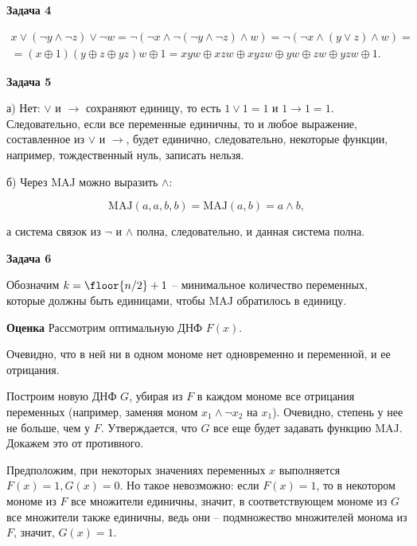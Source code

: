 	\begin{center}
    \textbf{Задача 4}
\end{center}
		\begin{multline*}
			x \lor (\neg y \land \neg z) \lor \neg w = \neg (\neg x \land \neg (\neg y \land \neg z) \land w) = \neg (\neg x \land (y \lor z) \land w) = \\
			= (x \oplus 1)(y \oplus z \oplus yz)w \oplus 1 = xyw \oplus xzw \oplus xyzw \oplus yw \oplus zw \oplus yzw \oplus 1.
		\end{multline*}


	\begin{center}
    \textbf{Задача 5}
\end{center}
		а) Нет: $\lor$ и $\rightarrow$ сохраняют единицу, то есть $1 \lor 1 = 1$ и $1 \rightarrow 1 = 1$. Следовательно, если все переменные единичны, то и любое выражение, составленное из $\lor$ и $\rightarrow$, будет единично, следовательно, некоторые функции, например, тождественный нуль, записать нельзя.

		б) Через $\mathrm{MAJ}$ можно выразить $\land$:

		\begin{equation*}
			\mathrm{MAJ}(a, a, b, b) = \mathrm{MAJ}(a, b) = a \land b,
		\end{equation*}

		а система связок из $\neg$ и $\land$ полна, следовательно, и данная система полна.


	\begin{center}
    \textbf{Задача 6}
\end{center}
		Обозначим $k = \floor{n/2} + 1$ -- минимальное количество переменных, которые должны быть единицами, чтобы $\mathrm{MAJ}$ обратилось в единицу.

		\textbf{Оценка}
			Рассмотрим оптимальную ДНФ $F(x)$.

			Очевидно, что в ней ни в одном мономе нет одновременно и переменной, и ее отрицания.

			Построим новую ДНФ $G$, убирая из $F$ в каждом мономе все отрицания переменных (например, заменяя моном $x_1 \land \neg x_2$ на $x_1$). Очевидно, степень у нее не больше, чем у $F$. Утверждается, что $G$ все еще будет задавать функцию $\mathrm{MAJ}$. Докажем это от противного.

			Предположим, при некоторых значениях переменных $x$ выполняется $F(x) = 1, G(x) = 0$. Но такое невозможно: если $F(x) = 1$, то в некотором мономе из $F$ все множители единичны, значит, в соответствующем мономе из $G$ все множители также единичны, ведь они -- подмножество множителей монома из $F$, значит, $G(x) = 1$.

